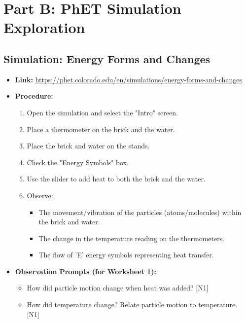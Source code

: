 \documentclass[11pt, a4paper]{article} %
\begin{document}
\section*{Part B: PhET Simulation Exploration}

\subsection*{Simulation: Energy Forms and Changes}
\begin{itemize}
    \item \textbf{Link:} \href{https://phet.colorado.edu/en/simulations/energy-forms-and-changes}{https://phet.colorado.edu/en/simulations/energy-forms-and-changes}
    \item \textbf{Procedure:}
        \begin{enumerate}
        \item Open the simulation and select the "Intro" screen.
        \item Place a thermometer on the brick and the water.
        \item Place the brick and water on the stands.
        \item Check the "Energy Symbols" box.
        \item Use the slider to add heat to both the brick and the water.
        \item Observe:
            \begin{itemize}
                \item The movement/vibration of the particles (atoms/molecules) within the brick and water.
                \item The change in the temperature reading on the thermometers.
                \item The flow of 'E' energy symbols representing heat transfer.
            \end{itemize}
        \end{enumerate}
    \item \textbf{Observation Prompts (for Worksheet 1):}
        \begin{itemize}
            \item How did particle motion change when heat was added? [N1]
            \item How did temperature change? Relate particle motion to temperature. [N1]
        \end{itemize}
\end{itemize}
\end{document}
